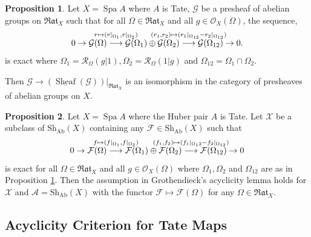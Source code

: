 \documentclass[10pt]{article}
\numberwithin{equation}{section}
\theoremstyle{definition}
\newtheorem{proposition}{Proposition}[subsection]
\DeclareMathOperator{\Spa}{Spa}
\DeclareMathOperator{\Sheaf}{Sheaf}
\newcommand{\cR}[0]{\mathcal{R}}
\newcommand{\cF}[0]{\mathcal{F}}
\newcommand{\Rat}[0]{\mathfrak{Rat}}
\begin{document}
\begin{proposition}
    \label{proposition_24_6}
    Let $X=\Spa A$ where $A$ is Tate, $\mathcal{G}$ be a presheaf of abelian groups on $\Rat_X$ such that for all $\Omega\in\Rat_X$ and all $g\in\mathcal{O}_X(\Omega)$, the sequence,
    \begin{equation*}
        0\to\mathcal{G}(\Omega)\stackrel{\substack{\mathmakebox[0pt][c]{r\mapsto(r|_{\Omega_1},r|_{\Omega_2})}\\\:}}{\longrightarrow}\mathcal{G}(\Omega_1)\oplus\mathcal{G}(\Omega_2)\stackrel{\substack{\mathmakebox[0pt][c]{(r_1,r_2)\mapsto(r_1|_{\Omega_{12}}-r_2|_{\Omega_{12}})}\\\:}}{\longrightarrow}\mathcal{G}(\Omega_{12})\to0.
    \end{equation*}
    is exact where $\Omega_1 = \cR_\Omega(g|1),\Omega_2 = \cR_\Omega(1|g)$ and $\Omega_{12} = \Omega_1\cap \Omega_2$.
    \par Then $\mathcal{G}\to(\underline{\Sheaf}(\mathcal{G}))|_{\Rat_X}$ is an isomorphism in the category of presheaves of abelian groups on $X$.
\end{proposition}

\begin{proposition}
    \label{proposition_24_7}
    Let $X=\Spa A$ where the Huber pair $A$ is Tate.
    Let $\mathscr{X}$ be a subclass of $\mathrm{Sh}_{\mathrm{Ab}}(X)$ containing any $\cF\in\mathrm{Sh}_{\mathrm{Ab}}(X)$ such that
    \begin{equation*}
        0\to\mathcal{F}(\Omega)\stackrel{\substack{\mathmakebox[0pt][c]{f\mapsto(f|_{\Omega_1},f|_{\Omega_2})}\\\:}}{\longrightarrow}\mathcal{F}(\Omega_1)\oplus\mathcal{F}(\Omega_2)\stackrel{\substack{\mathmakebox[0pt][c]{(f_1,f_2)\mapsto(f_1|_{\Omega_12}-f_2|_{\Omega_{12}})}\\\:}}{\longrightarrow}\mathcal{F}(\Omega_{12})\to 0
    \end{equation*}
    is exact for all $\Omega\in\Rat_X$ and all $g\in\mathcal{O}_X(\Omega)$ where $\Omega_1,\Omega_2$ and $\Omega_{12}$ are as in Proposition \ref{proposition_24_6}. Then the assumption in Grothendieck's acyclicity lemma holds for $\mathscr{X}$ and $\mathscr{A}=\mathrm{Sh}_{\mathrm{Ab}}(X)$ with the functor $\cF\mapsto \cF(\Omega)$ for any $\Omega\in\Rat_X$.
\end{proposition}

\subsection{Acyclicity Criterion for Tate Maps}
\end{document}
